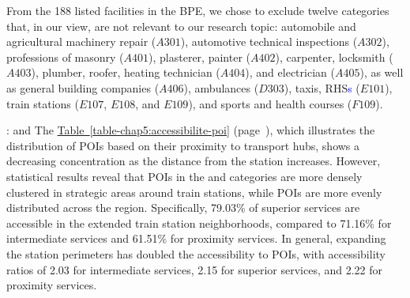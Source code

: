 \begin{refsegment}
{\begin{customitemize}
    \end{customitemize}
From the 188 listed facilities in the \acrfull{BPE}, we chose to exclude twelve categories that, in our view, are not relevant to our research topic: automobile and agricultural machinery repair (\(A301\)), automotive technical inspections (\(A302\)), professions of masonry (\(A401\)), plasterer, painter (\(A402\)), carpenter, locksmith (\(A403\)), plumber, roofer, heating technician (\(A404\)), and electrician (\(A405\)), as well as general building companies (\(A406\)), ambulances (\(D303\)), taxis, \acrshort{RHS}\textcolor{blue}{s} (\(E101\)), train stations (\(E107\), \(E108\), and \(E109\)), and sports and health courses (\(F109\)).
}:   and  The \hyperref[table-chap5:accessibilite-poi]{Table~\ref{table-chap5:accessibilite-poi}} (page~\pageref{table-chap5:accessibilite-poi}), which illustrates the distribution of \acrshort{POIs} based on their proximity to transport hubs, shows a decreasing concentration as the distance from the station increases. However, statistical results reveal that \acrshort{POIs} in the  and  categories are more densely clustered in strategic areas around train stations, while  \acrshort{POIs} are more evenly distributed across the region. Specifically, 79.03\% of superior services are accessible in the extended train station neighborhoods, compared to 71.16\% for intermediate services and 61.51\% for proximity services. In general, expanding the station perimeters has doubled the accessibility to \acrshort{POIs}, with accessibility ratios of 2.03 for intermediate services, 2.15 for superior services, and 2.22 for proximity services.%


\end{refsegment}
